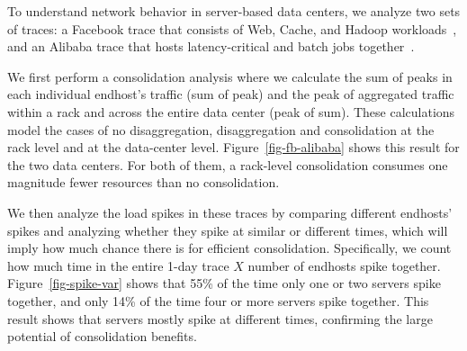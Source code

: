 To understand network behavior in server-based data centers, we analyze two sets of traces: a Facebook trace that consists of Web, Cache, and Hadoop workloads~\cite{facebook-sigcomm15}, and an Alibaba trace that hosts latency-critical and batch jobs together~\cite{alibaba-trace}. 

We first perform a consolidation analysis where we calculate the sum of peaks in each individual endhost's traffic (sum of peak) and the peak of aggregated traffic within a rack and across the entire data center (peak of sum). 
These calculations model the cases of no disaggregation, disaggregation and consolidation at the rack level and at the data-center level.
Figure~\ref{fig-fb-alibaba} shows this result for the two data centers. 
For both of them, a rack-level consolidation consumes one magnitude fewer resources than no consolidation.

We then analyze the load spikes in these traces
by comparing different endhosts' spikes and analyzing whether they spike at similar or different times, which will imply how much chance there is for efficient consolidation.
Specifically, we count how much time in the entire 1-day trace $X$ number of endhosts spike together.
Figure~\ref{fig-spike-var} shows that 55\% of the time only one or two servers spike together, and only 14\% of the time four or more servers spike together.
This result shows that servers mostly spike at different times, confirming the large potential of consolidation benefits.
%

